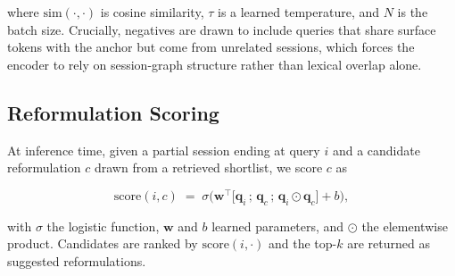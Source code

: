 where $\mathrm{sim}(\cdot,\cdot)$ is cosine similarity, $\tau$ is a learned
temperature, and $N$ is the batch size. Crucially, negatives are drawn to include
queries that share surface tokens with the anchor but come from unrelated sessions,
which forces the encoder to rely on session-graph structure rather than lexical
overlap alone.

\subsection{Reformulation Scoring}

At inference time, given a partial session ending at query $i$ and a candidate
reformulation $c$ drawn from a retrieved shortlist, we score $c$ as

\begin{equation}
\mathrm{score}(i, c) \;=\; \sigma\!\Big(\mathbf{w}^{\top}
  \big[\mathbf{q}_i \,;\, \mathbf{q}_c \,;\, \mathbf{q}_i \odot \mathbf{q}_c\big]
  + b\Big),
\label{eq:score}
\end{equation}

with $\sigma$ the logistic function, $\mathbf{w}$ and $b$ learned parameters, and
$\odot$ the elementwise product. Candidates are ranked by $\mathrm{score}(i,\cdot)$
and the top-$k$ are returned as suggested reformulations.
